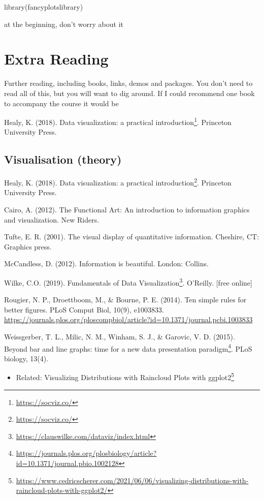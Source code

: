 \documentclass[
  12pt,
  a5paper,
]{book}
\DeclareRobustCommand{\href}[2]{#2\footnote{\url{#1}}}
\providecommand{\tightlist}{%
  \setlength{\itemsep}{0pt}\setlength{\parskip}{0pt}}
\begin{document}
library(fancyplotslibrary)

at the beginning, don't worry about it

\hypertarget{extra-reading}{%
\chapter{Extra Reading}\label{extra-reading}}

Further reading, including books, links, demos and packages. You don't need to read all of this, but you will want to dig around. If I could recommend one book to accompany the course it would be

Healy, K. (2018). \href{https://socviz.co/}{Data visualization: a practical introduction}. Princeton University Press.

\hypertarget{visualisation-theory}{%
\section{Visualisation (theory)}\label{visualisation-theory}}

Healy, K. (2018). \href{https://socviz.co/}{Data visualization: a practical introduction}. Princeton University Press.

Cairo, A. (2012). The Functional Art: An introduction to information graphics and visualization. New Riders.

Tufte, E. R. (2001). The visual display of quantitative information. Cheshire, CT: Graphics press.

McCandless, D. (2012). Information is beautiful. London: Collins.

Wilke, C.O. (2019). \href{https://clauswilke.com/dataviz/index.html}{Fundamentals of Data Visualization}. O'Reilly. {[}free online{]}

Rougier, N. P., Droettboom, M., \& Bourne, P. E. (2014). Ten simple rules for better figures. PLoS Comput Biol, 10(9), e1003833. \url{https://journals.plos.org/ploscompbiol/article?id=10.1371/journal.pcbi.1003833}

Weissgerber, T. L., Milic, N. M., Winham, S. J., \& Garovic, V. D. (2015). \href{https://journals.plos.org/plosbiology/article?id=10.1371/journal.pbio.1002128}{Beyond bar and line graphs: time for a new data presentation paradigm}. PLoS biology, 13(4).

\begin{itemize}
\tightlist
\item
  Related: \href{https://www.cedricscherer.com/2021/06/06/visualizing-distributions-with-raincloud-plots-with-ggplot2/}{Visualizing Distributions with Raincloud Plots with ggplot2}
\end{itemize}
\end{document}
